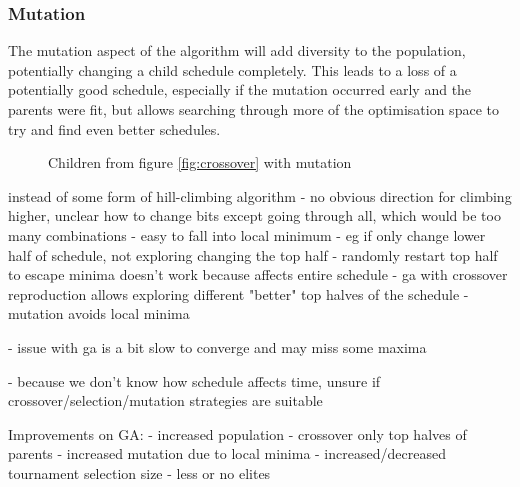 \documentclass{article}
\def\listset{\pgfqkeys{/List}}
\begin{document}
\subsubsection{Mutation}
The mutation aspect of the algorithm will add diversity to the population, potentially changing a child schedule completely. This leads to a loss of a potentially good schedule, especially if the mutation occurred early and the parents were fit, but allows searching through more of the optimisation space to try and find even better schedules.
\begin{figure}[H]
\centering
{}
\caption{Children from figure \ref{fig:crossover} with mutation}
\label{fig:mutation}
\end{figure}

\noindent 
instead of some form of hill-climbing algorithm
- no obvious direction for climbing  higher, unclear how to change bits except going through all, which would be too many combinations
- easy to fall into local minimum 
- eg if only change lower half of schedule, not exploring changing the top half
- randomly restart top half to escape minima doesn't work because affects entire schedule
- ga with crossover reproduction allows exploring different "better" top halves of the schedule
- mutation avoids local minima

- issue with ga is a bit slow to converge and may miss some maxima

- because we don't know how schedule affects time, unsure if crossover/selection/mutation strategies are suitable

Improvements on GA:
- increased population
- crossover only top halves of parents
- increased mutation due to local minima
- increased/decreased tournament selection size
- less or no elites
\end{document}
